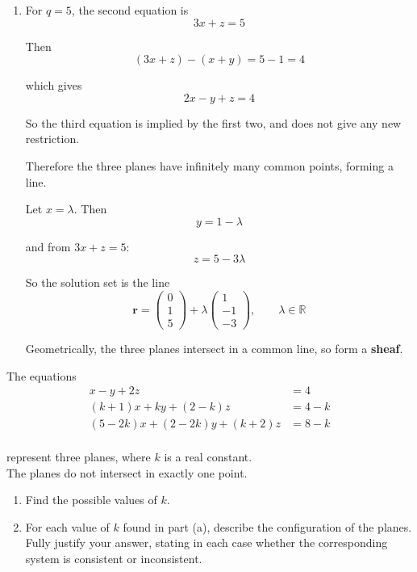 \documentclass[leqno]{article}
\begin{document}
\begin{enumerate}[
  label=\textbf{\arabic*.},
  leftmargin=*,
  topsep=0pt,
  partopsep=0pt,
  parsep=0pt
]
\begin{djsSolution}
\begin{enumerate}[label=\textbf{(\alph*)}]
\begin{enumerate}[label=(\roman*)]
    So the third equation requires
    \[
    q-1=4
    \]

    Hence
    \[
    q=5
    \]

    \item For $q=5$, the second equation is
    \[
    3x+z=5
    \]

    Then
    \[
    (3x+z)-(x+y)=5-1=4
    \]

    which gives
    \[
    2x-y+z=4
    \]

    So the third equation is implied by the first two, and does not give any new restriction.

    Therefore the three planes have infinitely many common points, forming a line.

    Let $x=\lambda$. Then
    \[
    y=1-\lambda
    \]

    and from $3x+z=5$:
    \[
    z=5-3\lambda
    \]

    So the solution set is the line
    \[
    \mathbf{r}=\begin{pmatrix}0\\1\\5\end{pmatrix}+\lambda\begin{pmatrix}1\\-1\\-3\end{pmatrix},\qquad \lambda\in\mathbb{R}
    \]

    Geometrically, the three planes intersect in a common line, so form a \textbf{sheaf}.
  \end{enumerate}
\end{enumerate}
\end{djsSolution}

\newpage

\questionitem

The equations
\[
\begin{aligned}
x-y+2z&=4\\
(k+1)x+ky+(2-k)z&=4-k\\
(5-2k)x+(2-2k)y+(k+2)z&=8-k
\end{aligned}
\] \\
represent three planes, where $k$ is a real constant. \\
The planes do not intersect in exactly one point. \\
\begin{enumerate}[label=\textbf{(\alph*)}]
  \item Find the possible values of $k$.  \\
  \item For each value of $k$ found in part (a), describe the configuration of the planes. \\
  Fully justify your answer, stating in each case whether the corresponding system is consistent or inconsistent.  \\
\end{enumerate}


\end{enumerate}
\end{document}
